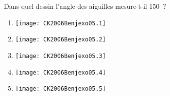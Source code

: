 Dans quel dessin l'angle des aiguilles mesure-t-il 150\degres\ ?
\begin{multicols}{5}
  \begin{enumerate}[A/]
  \item \texttt{[image: CK2006Benjexo05.1]}
  \item \texttt{[image: CK2006Benjexo05.2]}
  \item \texttt{[image: CK2006Benjexo05.3]}
  \item \texttt{[image: CK2006Benjexo05.4]}
  \item \texttt{[image: CK2006Benjexo05.5]}
  \end{enumerate}
\end{multicols}